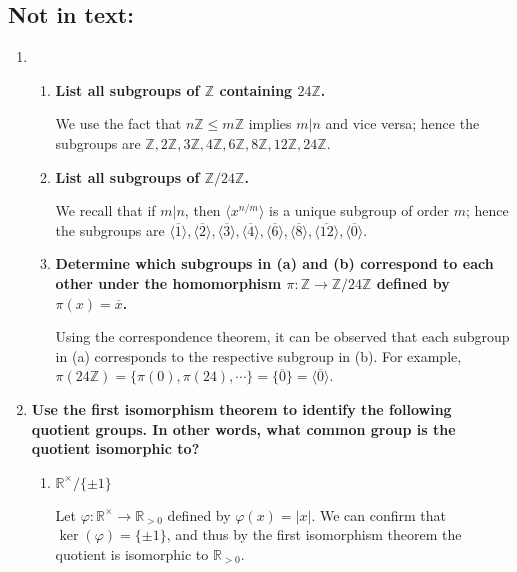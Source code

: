 \documentclass[a4paper,12pt]{article}
\begin{document}
\subsection*{Not in text:}
\begin{enumerate}
    \item
        \begin{enumerate}
            \item
                \boldmath
                \textbf{List all subgroups of $\mathbb{Z}$ containing $24\mathbb{Z}$.} \par
                \unboldmath
                We use the fact that $n\mathbb{Z} \leq m\mathbb{Z}$ implies $m | n$ and vice versa; hence the subgroups are $\mathbb{Z}, 2\mathbb{Z}, 3\mathbb{Z}, 4\mathbb{Z}, 6\mathbb{Z}, 8\mathbb{Z}, 12\mathbb{Z}, 24\mathbb{Z}$.

            \item
                \boldmath
                \textbf{List all subgroups of $\mathbb{Z}/24\mathbb{Z}$.} \par
                \unboldmath
                We recall that if $m | n$, then $\langle x^{n/m} \rangle$ is a unique subgroup of order $m$; hence the subgroups are $\langle \overline{1} \rangle, \langle \overline{2} \rangle, \langle \overline{3} \rangle, \langle \overline{4} \rangle, \langle \overline{6} \rangle, \langle \overline{8} \rangle, \langle \overline{12} \rangle, \langle \overline{0} \rangle$.

            \item
                \boldmath
                \textbf{Determine which subgroups in (a) and (b) correspond to each other under the homomorphism $\pi : \mathbb{Z} \to \mathbb{Z}/24\mathbb{Z}$ defined by $\pi(x) = \overline{x}$.} \par
                \unboldmath
                Using the correspondence theorem, it can be observed that each subgroup in (a) corresponds to the respective subgroup in (b). For example, $\pi(24\mathbb{Z}) = \{ \pi(0), \pi(24), \cdots \} = \{ \overline{0} \} = \langle \overline{0} \rangle$.
        \end{enumerate}

    \item
        \boldmath
        \textbf{Use the first isomorphism theorem to identify the following quotient groups. In other words, what common group is the quotient isomorphic to?}
        \unboldmath
        \begin{enumerate}
            \item
                \boldmath
                \textbf{$\mathbb{R}^\times/\{\pm 1\}$} \par
                \unboldmath
                Let $\varphi : \mathbb{R}^\times \to \mathbb{R}_{>0}$ defined by $\varphi(x) = |x|$. We can confirm that $\ker(\varphi) = \{ \pm 1 \}$, and thus by the first isomorphism theorem the quotient is isomorphic to $\mathbb{R}_{>0}$.


\end{enumerate}
\end{enumerate}
\end{document}
